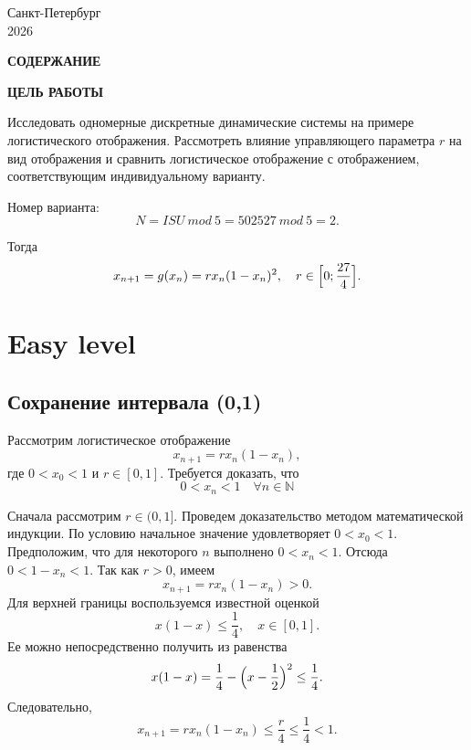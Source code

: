 \documentclass[14pt,a4paper]{extarticle}
\newcommand{\structelement}[1]{
\clearpage
\begin{center}
\bfseries\MakeUppercase{#1}
\end{center}
\addcontentsline{toc}{section}{#1}
\vspace{6pt}
}
\begin{document}
\vfill
\begin{center}
\fontsize{14pt}{14pt}\selectfont
Санкт-Петербург \\
2026
\end{center}

\clearpage

\begin{center}
    \bfseries СОДЕРЖАНИЕ
\end{center}
\vspace{12pt}
\renewcommand{\contentsname}{}
\vspace{-30pt}
\tableofcontents



\structelement{Цель работы}

Исследовать одномерные дискретные динамические системы на примере логистического отображения. Рассмотреть влияние управляющего параметра $r$ на вид отображения и сравнить логистическое отображение с отображением, соответствующим индивидуальному варианту.

Номер варианта:
\[
N = ISU\ mod\ 5 = 502527\ mod\ 5 = 2.
\]

Тогда
\[
x_{n+1} = g(x_n) = rx_n (1 - x_n)^2, \quad r \in \Bigl[ 0; \frac{27}{4} \Bigr].
\]

\clearpage


\section{Easy level}

\subsection{Сохранение интервала (0,1)}

Рассмотрим логистическое отображение
\[
x_{n+1} = r x_n(1 - x_n),
\]
где $0 < x_0 < 1$ и $r \in [0,1]$.
Требуется доказать, что
\[
0 < x_n < 1 \quad \forall n \in \mathbb{N}
\]

Сначала рассмотрим $r \in (0,1]$. Проведем доказательство методом математической индукции. По условию начальное значение удовлетворяет $0 < x_0 < 1$. Предположим, что для некоторого $n$ выполнено $0 < x_n < 1$. Отсюда $0 < 1 - x_n < 1$. Так как $r > 0$, имеем
\[
x_{n+1} = r x_n(1 - x_n) > 0.
\]
Для верхней границы воспользуемся известной оценкой
\[
x(1 - x) \leq \frac{1}{4}, \quad x \in [0,1].
\]
Ее можно непосредственно получить из равенства
\[
x(1 - x) = \frac{1}{4} - \Bigl( x - \frac{1}{2} \Bigr)^2 \leq \frac{1}{4}.
\]
Следовательно,
\[
x_{n+1} = r x_n(1 - x_n) \leq \frac{r}{4} \leq \frac{1}{4} < 1.
\]
\end{document}
